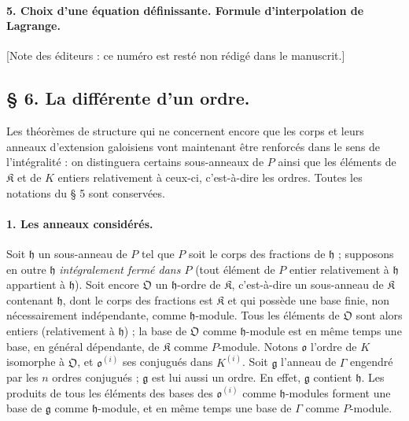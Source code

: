 \paragraph{5. Choix d'une équation définissante. Formule d'interpolation de Lagrange.}
[Note des éditeurs : ce numéro est resté non rédigé dans le manuscrit.]

\subsection*{\S{} 6. La différente d'un ordre.}

Les théorèmes de structure qui ne concernent encore que les corps et leurs anneaux d'extension galoisiens vont maintenant être renforcés dans le sens de l'intégralité : on distinguera certains sous-anneaux de $P$ ainsi que les éléments de $\mathfrak K$ et de $K$ entiers relativement à ceux-ci, c'est-à-dire les ordres. Toutes les notations du \S{} 5 sont conservées.

\paragraph{1. Les anneaux considérés.}
Soit $\mathfrak h$ un sous-anneau de $P$ tel que $P$ soit le corps des fractions de $\mathfrak h$ ; supposons en outre $\mathfrak h$ \emph{intégralement fermé dans $P$} (tout élément de $P$ entier relativement à $\mathfrak h$ appartient à $\mathfrak h$). Soit encore $\mathfrak O$ un $\mathfrak h$-ordre de $\mathfrak K$, c'est-à-dire un sous-anneau de $\mathfrak K$ contenant $\mathfrak h$, dont le corps des fractions est $\mathfrak K$ et qui possède une base finie, non nécessairement indépendante, comme $\mathfrak h$-module. Tous les éléments de $\mathfrak O$ sont alors entiers (relativement à $\mathfrak h$) ; la base de $\mathfrak O$ comme $\mathfrak h$-module est en même temps une base, en général dépendante, de $\mathfrak K$ comme $P$-module. Notons $\mathfrak o$ l'ordre de $K$ isomorphe à $\mathfrak O$, et $\mathfrak o^{(i)}$ ses conjugués dans $K^{(i)}$. Soit $\mathfrak g$ l'anneau de $\Gamma$ engendré par les $n$ ordres conjugués ; $\mathfrak g$ est lui aussi un ordre. En effet, $\mathfrak g$ contient $\mathfrak h$. Les produits de tous les éléments des bases des $\mathfrak o^{(i)}$ comme $\mathfrak h$-modules forment une base de $\mathfrak g$ comme $\mathfrak h$-module, et en même temps une base de $\Gamma$ comme $P$-module.

